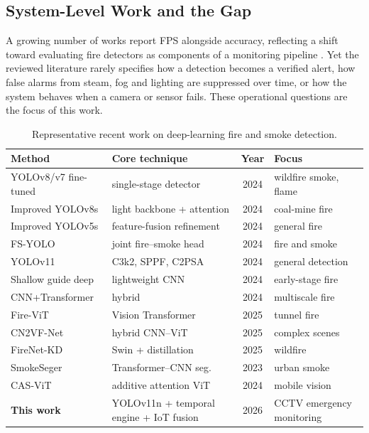 \documentclass[conference]{IEEEtran}
\begin{document}
\subsection{System-Level Work and the Gap}
A growing number of works report FPS alongside accuracy, reflecting a shift toward evaluating fire detectors as components of a monitoring pipeline \cite{jing2023smokeseger,elmadafri2024}. Yet the reviewed literature rarely specifies how a detection becomes a verified alert, how false alarms from steam, fog and lighting are suppressed over time, or how the system behaves when a camera or sensor fails. These operational questions are the focus of this work.

\begin{table}[t]
\caption{Representative recent work on deep-learning fire and smoke detection.}
\label{tab:lit}
\centering
\footnotesize
\begin{tabular}{p{2.1cm}p{2.3cm}cp{1.9cm}}
\toprule
\textbf{Method} & \textbf{Core technique} & \textbf{Year} & \textbf{Focus} \\
\midrule
YOLOv8/v7 fine-tuned \cite{saleh2024} & single-stage detector & 2024 & wildfire smoke, flame \\
Improved YOLOv8s \cite{kong2024} & light backbone + attention & 2024 & coal-mine fire \\
Improved YOLOv5s \cite{dou2024} & feature-fusion refinement & 2024 & general fire \\
FS-YOLO \cite{wang2024fsyolo} & joint fire--smoke head & 2024 & fire and smoke \\
YOLOv11 \cite{khanam2024yolov11} & C3k2, SPPF, C2PSA & 2024 & general detection \\
Shallow guide deep \cite{li2024shallow} & lightweight CNN & 2024 & early-stage fire \\
CNN+Transformer \cite{wu2024} & hybrid & 2024 & multiscale fire \\
Fire-ViT \cite{liu2025firevit} & Vision Transformer & 2025 & tunnel fire \\
CN2VF-Net \cite{ahmad2025cn2vf} & hybrid CNN--ViT & 2025 & complex scenes \\
FireNet-KD \cite{ahmad2025firenet} & Swin + distillation & 2025 & wildfire \\
SmokeSeger \cite{jing2023smokeseger} & Transformer--CNN seg. & 2023 & urban smoke \\
CAS-ViT \cite{zhang2024casvit} & additive attention ViT & 2024 & mobile vision \\
\textbf{This work} & YOLOv11n + temporal engine + IoT fusion & 2026 & CCTV emergency monitoring \\
\bottomrule
\end{tabular}
\end{table}
\end{document}
